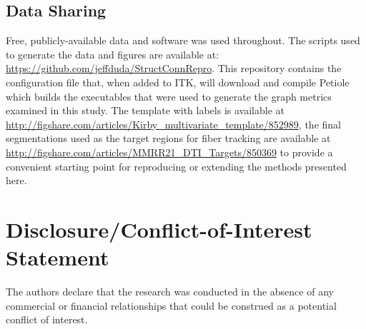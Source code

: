\documentclass{frontiersSCNS} %
\begin{document}
\subsection{Data Sharing}
Free, publicly-available data and software was used throughout. The scripts used to generate the data and figures are available at: \url{https://github.com/jeffduda/StructConnRepro}. This repository contains the configuration file that, when added to ITK, will download and compile Petiole which builds the executables that were used to generate the graph metrics examined in this study. The template with labels is available at \url{http://figshare.com/articles/Kirby_multivariate_template/852989}, the final segmentations used as the target regions for fiber tracking are available at \url{http://figshare.com/articles/MMRR21_DTI_Targets/850369} to provide a convenient starting point for reproducing or extending the methods presented here. 

\section*{Disclosure/Conflict-of-Interest Statement}
The authors declare that the research was conducted in the absence of any commercial or financial relationships that could be construed as a potential conflict of interest.


\end{document}
